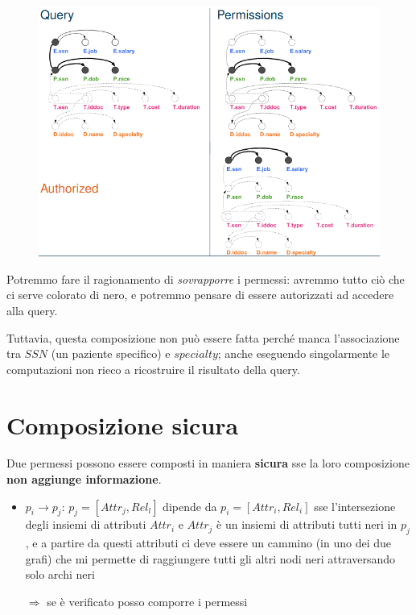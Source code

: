 \documentclass{report}
\begin{document}
\begin{figure}[H]
    \centering
    \includegraphics[width=1\linewidth]{images/comp1.png}
\end{figure}

\noindent Potremmo fare il ragionamento di \textit{sovrapporre} i permessi: avremmo tutto ciò che ci serve colorato di nero, e potremmo 
pensare di essere autorizzati ad accedere alla query.

\noindent Tuttavia, questa composizione non può essere fatta perché manca l'associazione tra $SSN$ (un paziente specifico) e $specialty$; anche eseguendo 
singolarmente le computazioni non rieco a ricostruire il risultato della query.

\section{Composizione sicura}
Due permessi possono essere composti in maniera \textbf{sicura} sse la loro composizione \textbf{non aggiunge informazione}.
\begin{itemize}
    \item $p_i \rightarrow p_j$: $p_j = [Attr_j, Rel_l]$ dipende da $p_i = [Attr_i, Rel_i]$ sse l'intersezione degli insiemi di attributi 
    $Attr_i$ e $Attr_j$ è un insiemi di attributi tutti neri in $p_j$, e a partire da questi attributi ci deve essere un cammino (in uno dei due grafi)
    che mi permette di raggiungere tutti gli altri nodi neri attraversando solo archi neri

    $\Rightarrow$ se è verificato posso comporre i permessi
\end{itemize}
\end{document}

